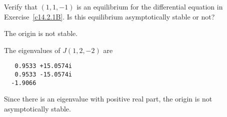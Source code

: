 \documentclass{ximera}
\begin{document}
\begin{exercise} \label{c14.2.1D}
Verify that $(1,1,-1)$ is an equilibrium for the differential equation in 
Exercise~\ref{c14.2.1B}.  Is this equilibrium asymptotically stable or not?

\begin{solution}
\ans The origin is not stable.

\soln The eigenvalues of $J(1,2,-2)$ are
\begin{verbatim}
   0.9533 +15.0574i
   0.9533 -15.0574i
  -1.9066    
\end{verbatim}
Since there is an eigenvalue with positive real part, the origin is not 
asymptotically stable.

\end{solution}
\end{exercise}
\end{document}
